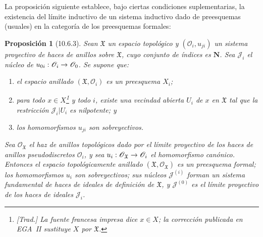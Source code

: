 \documentclass[oneside]{amsart}
\theoremstyle{ega-env-style}
\theoremstyle{ega-thm-env-style}
\newtheorem*{proposition}{Proposición}
\theoremstyle{ega-defn-env-style}
\renewcommand{\to}{\mathchoice{\longrightarrow}{\rightarrow}{\rightarrow}{\rightarrow}}
\newcommand{\oldpage}[2][]{{\marginnote{\normalfont{\textbf{#1}~|~#2}}}\ignorespaces}
\let\EGAOriginalLabel\label
\renewcommand{\label}[1]{\phantomsection\EGAOriginalLabel{#1}}
\begin{document}
La proposición siguiente establece, bajo ciertas condiciones suplementarias, la existencia del límite inductivo de un sistema inductivo dado de preesquemas (usuales) en la categoría de los preesquemas formales:
\begin{proposition}[10.6.3]
\label{I.10.6.3}
Sean $\mathfrak{X}$ un espacio topológico y $(\mathscr{O}_i,u_{ji})$ un sistema proyectivo de haces de anillos sobre $\mathfrak{X}$, cuyo conjunto de índices es $\mathbf{N}$.
Sea $\mathscr{J}_i$ el núcleo de $u_{0i}:\mathscr{O}_i\to\mathscr{O}_0$.
Se supone que:
\begin{enumerate}
  \item[\textup{a)}] el espacio anillado $(\mathfrak{X},\mathscr{O}_i)$ es un preesquema $X_i$;
  \item[\textup{b)}] para todo $x\in X$\footnote{\emph{[Trad.] La fuente francesa impresa dice $x\in X$; la corrección publicada en EGA~II sustituye $X$ por $\mathfrak{X}$.}} y todo $i$, existe una vecindad abierta $U_i$ de $x$ en $\mathfrak{X}$ tal que la restricción $\mathscr{J}_i|U_i$ es nilpotente; y
  \item[\textup{c)}] los homomorfismos $u_{ji}$ son sobreyectivos.
\end{enumerate}

\oldpage[I]{190}
Sea $\mathscr{O}_{\mathfrak{X}}$ el haz de anillos topológicos dado por el límite proyectivo de los haces de anillos pseudodiscretos $\mathscr{O}_i$, y sea $u_i:\mathscr{O}_{\mathfrak{X}}\to\mathscr{O}_i$ el homomorfismo canónico.
Entonces el espacio topológicamente anillado $(\mathfrak{X},\mathscr{O}_{\mathfrak{X}})$ es un preesquema formal; los homomorfismos $u_i$ son sobreyectivos; sus núcleos $\mathscr{J}^{(i)}$ forman un sistema fundamental de haces de ideales de definición de $\mathfrak{X}$, y $\mathscr{J}^{(0)}$ es el límite proyectivo de los haces de ideales $\mathscr{J}_i$.
\end{proposition}
\end{document}
